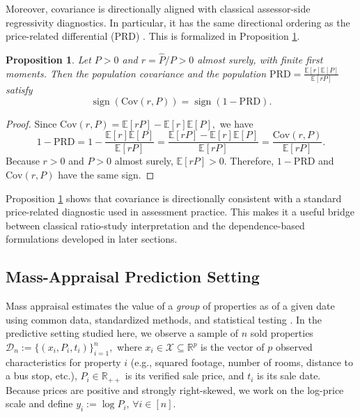 \documentclass[12pt, draft]{article}
\theoremstyle{plain}
\newtheorem{proposition}{Proposition}
\theoremstyle{definition}
\newcommand{\R}{\mathbb{R}}
\newcommand{\1}{\mathbf{1}}
\newcommand{\Cov}{\text{Cov}}
\renewcommand{\R}{\mathbb{R}}
\newcommand{\Expected}[1]{\mathbb{E}[#1]}
\begin{document}
{Moreover, covariance is directionally aligned with classical assessor-side regressivity diagnostics. In particular, it has the same directional ordering as the price-related differential (PRD) \cite{IAAO2025ExposureRatio}. This is formalized in Proposition \ref{prop:cov_prd}.

\begin{proposition}
\label{prop:cov_prd}
Let $P>0$ and $r=\widehat P/P>0$ almost surely, with finite first moments. Then the population covariance  and the population
$
\mathrm{PRD}=\frac{\Expected{r}\Expected{P}}{\Expected{rP}}
$
satisfy
\begin{equation}
\label{eq:cov_prd_sign}
\operatorname{sign}\!\left(\Cov(r,P)\right)
=
\operatorname{sign}\!\left(1-\mathrm{PRD}\right).
\end{equation}
\end{proposition}

\begin{proof}
Since
$
\Cov(r,P)=\Expected{rP}-\Expected{r}\Expected{P},
$
we have
\[
1-\mathrm{PRD}
=
1-\frac{\Expected{r}\Expected{P}}{\Expected{rP}}
=
\frac{\Expected{rP}-\Expected{r}\Expected{P}}{\Expected{rP}}
=
\frac{\Cov(r,P)}{\Expected{rP}}.
\]
Because $r>0$ and $P>0$ almost surely, $\Expected{rP}>0$. Therefore, $1-\mathrm{PRD}$ and $\Cov(r,P)$ have the same sign.
\end{proof}

Proposition \ref{prop:cov_prd} shows that covariance is directionally consistent with a standard price-related diagnostic used in assessment practice. This makes it a useful bridge between classical ratio-study interpretation and the dependence-based formulations developed in later sections.

\subsection{Mass-Appraisal Prediction Setting}
\label{subsec:prediction_setting}

Mass appraisal estimates the value of a \emph{group} of properties as of a given date using common data, standardized methods, and statistical testing \cite{IAAO2025Mass}. In the predictive setting studied here, we observe a sample of $n$ sold properties $
\mathcal D_n := \{(x_i,P_i,t_i)\}_{i=1}^n,
$
where $x_i\in\mathcal X\subseteq \R^p$ is the vector of $p$ observed characteristics for property $i$ (e.g., squared footage, number of
rooms, distance to a bus stop, etc.), $P_i\in\mathbb R_{++}$ is its verified sale price, and $t_i$ is its sale date. Because prices are positive and strongly right-skewed, we work on the log-price scale and define
$
y_i := \log P_i,
\, \forall i\in[n].
$

}
\end{document}

